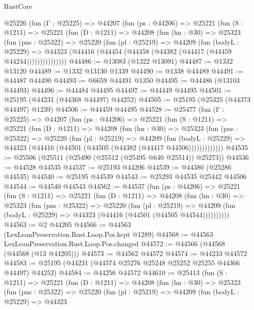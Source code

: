 \begin{lexlean}{RustCore}
\begin{coremodule}
    @25226
      (fun (Γ : @25225) =>
      @44207
        (fun (ps : @44206) =>
        @25221
          (fun (S : @1211) =>
          @25221
            (fun (D : @1211) =>
            @44208
              (fun (hn : @30) =>
              @25323
                (fun (pns : @25322) =>
                @25220
                  (fun (pl : @25219) =>
                  @44209
                    (fun (bodyL : @25229) =>
                    @44323 (@44416 (@44454 (@44458 (@44382 (@44417 (@44459 @44244)))))))))))))))
@44486 := @13083 (@1322 @13091)
@44487 := @1332 @13120
@44489 := @1332 @13130 @1339
@44490 := @1338 @44489
@44491 := @44487 @44490
@44493 := @6659 @44491 @1350
@44495 := @44486 (@13103 @44493)
@44496 := @44484 @44495
@44497 := @44449 @44495
@44501 := @25195 (@44231 (@44368 @44497) @44252)
@44505 := @25195 (@25325 (@44373 @44497) @1239)
@44506 := @44459 @44495
@44528 := @25477
    (fun (Γ : @25225) =>
    @44207
      (fun (ps : @44206) =>
      @25221
        (fun (S : @1211) =>
        @25221
          (fun (D : @1211) =>
          @44208
            (fun (hn : @30) =>
            @25323
              (fun (pns : @25322) =>
              @25220
                (fun (pl : @25219) =>
                @44209
                  (fun (bodyL : @25229) =>
                  @44323 (@44416 (@44501 (@44505 (@44382 (@44417 @44506)))))))))))))
@44535 := @25506 (@25511 (@25490 (@25512 (@25495 @640 @25514)) @25273))
@44536 := @44528 @44535
@44537 := @25193 @44206
@44539 := @44380 (@25286 @44535)
@44540 := @25195 @44539
@44543 := @25293 @44535 @25442 @44506
@44544 := @44540 @44543
@44562 := @44537
    (fun (ps : @44206) =>
    @25221
      (fun (S : @1211) =>
      @25221
        (fun (D : @1211) =>
        @44208
          (fun (hn : @30) =>
          @25323
            (fun (pns : @25322) =>
            @25220
              (fun (pl : @25219) =>
              @44209 (fun (bodyL : @25229) => @44323 (@44416 (@44501 (@44505 @44544))))))))))
@44563 := @2 @44205
@44566 := @44563 (LexLeanPreservation.Rust.Loop.Pos.kept @1289)
@44568 := @44563 LexLeanPreservation.Rust.Loop.Pos.changed
@44572 := @44566 (@44568 (@44568 (@13 @44205)))
@44573 := @44562 @44572
@44574 := @44233 @44572
@44583 := @25195 (@44231 (@44574 @25276 @25248 @25252 @25255 @44366 @44497) @44252)
@44584 := @44256 @44572
@44610 := @25413
    (fun (S : @1211) =>
    @25221
      (fun (D : @1211) =>
      @44208
        (fun (hn : @30) =>
        @25323
          (fun (pns : @25322) =>
          @25220
            (fun (pl : @25219) =>
            @44209
              (fun (bodyL : @25229) =>
              @44323

\end{coremodule}
\end{lexlean}
